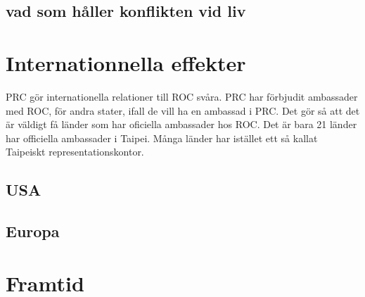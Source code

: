 \documentclass[a4paper,10pt]{article}
\begin{document}
\subsection{vad som håller konflikten vid liv}


\section{Internationnella effekter}
	PRC gör internationella relationer till ROC svåra. PRC har förbjudit ambassader med ROC, för andra stater, ifall de vill ha en ambassad i PRC. Det gör så att det är väldigt få länder som har oficiella 	ambassader hos ROC. Det är bara 21 länder har officiella ambassader i Taipei. Många länder har istället ett så kallat Taipeiskt representationskontor.

	\subsection{USA}
		

	\subsection{Europa}

\section{Framtid}

%
%
%
%
%
%
%
%
%
%
%
%
%
\end{document}

